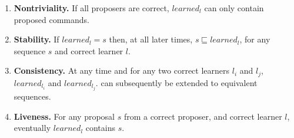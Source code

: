 %
\begin{enumerate}
\item \textbf{Nontriviality.} If all proposers are correct, $learned_l$ can only contain proposed commands.
\item \textbf{Stability.} If $learned_l = s$ then, at all later times, $s \sqsubseteq learned_l$, for any sequence $s$ and correct learner $l$.
\item \textbf{Consistency.} At any time and for any two correct learners $l_i$ and $l_j$, $learned_{l_i}$ and $learned_{l_j}$.
can subsequently be extended to equivalent sequences.
\item \textbf{Liveness.} For any proposal $s$ from a correct proposer, and correct learner $l$, eventually $learned_l$ contains $s$.
\end{enumerate}
